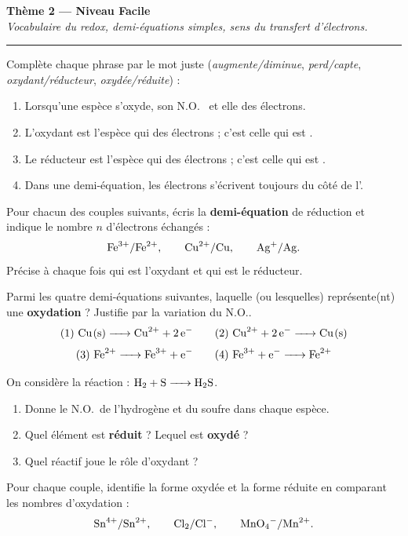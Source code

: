 \documentclass[11pt,a4paper]{article}
\newcommand{\NO}{\ensuremath{\mathrm{N.O.}}}
\newcounter{exo}
\begin{document}
\begin{center}
{\LARGE\bfseries\color{primarydark}Thème 2 — Niveau Facile}\\[2pt]
{\small\itshape Vocabulaire du redox, demi-équations simples, sens du transfert d'électrons.}\\[-4pt]
{\color{primary}\rule{\textwidth}{1pt}}
\end{center}

\begin{exo}
Complète chaque phrase par le mot juste (\emph{augmente/diminue}, \emph{perd/capte},
\emph{oxydant/réducteur}, \emph{oxydée/réduite}) :
\begin{enumerate}[label=(\alph*),leftmargin=2em,topsep=1pt,itemsep=1pt]
  \item Lorsqu'une espèce s'oxyde, son \NO\ \underline{\phantom{augmente}} et elle \underline{\phantom{capte}} des électrons.
  \item L'oxydant est l'espèce qui \underline{\phantom{capte}} des électrons ; c'est celle qui est \underline{\phantom{réduite}}.
  \item Le réducteur est l'espèce qui \underline{\phantom{capte}} des électrons ; c'est celle qui est \underline{\phantom{réduite}}.
  \item Dans une demi-équation, les électrons s'écrivent toujours du côté de l'\underline{\phantom{oxydant}}.
\end{enumerate}
\end{exo}

\begin{exo}
Pour chacun des couples suivants, écris la \textbf{demi-équation} de réduction et indique le nombre
$n$ d'électrons échangés :
\[
\ce{Fe^{3+}}/\ce{Fe^{2+}},\qquad \ce{Cu^{2+}}/\ce{Cu},\qquad \ce{Ag+}/\ce{Ag}.
\]
Précise à chaque fois qui est l'oxydant et qui est le réducteur.
\end{exo}

\begin{exo}
Parmi les quatre demi-équations suivantes, laquelle (ou lesquelles) représente(nt) une
\textbf{oxydation} ? Justifie par la variation du \NO.
\[
\text{(1) } \ce{Cu(s) -> Cu^{2+} + 2 e^-} \qquad
\text{(2) } \ce{Cu^{2+} + 2 e^- -> Cu(s)}
\]
\[
\text{(3) } \ce{Fe^{2+} -> Fe^{3+} + e^-} \qquad
\text{(4) } \ce{Fe^{3+} + e^- -> Fe^{2+}}
\]
\end{exo}

\begin{exo}
On considère la réaction : $\ce{H2 + S -> H2S}$.
\begin{enumerate}[label=(\alph*),leftmargin=2em,topsep=1pt,itemsep=1pt]
  \item Donne le \NO\ de l'hydrogène et du soufre dans chaque espèce.
  \item Quel élément est \textbf{réduit} ? Lequel est \textbf{oxydé} ?
  \item Quel réactif joue le rôle d'oxydant ?
\end{enumerate}
\end{exo}

\begin{exo}[identifier Ox et Red par le \NO]
Pour chaque couple, identifie la forme oxydée et la forme réduite en comparant les nombres
d'oxydation :
\[
\ce{Sn^{4+}}/\ce{Sn^{2+}},\qquad \ce{Cl2}/\ce{Cl^-},\qquad \ce{MnO4^-}/\ce{Mn^{2+}}.
\]
\end{exo}
\end{document}

